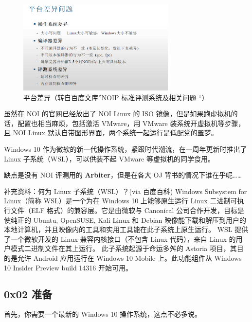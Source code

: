 \begin{figure}[htbp]
\centering
\includegraphics[width=0.7\textwidth]{docs/intro/images/WSL3.png} 
\caption{平台差异（转自百度文库”NOIP 标准评测系统及相关问题 “）}
\end{figure}



虽然在 NOI 的官网已经放出了 NOI Linux 的 ISO 镜像，但是如果跑虚拟机的话，配置也相当麻烦，包括激活 VMware，用 VMware 装系统开虚拟机等步骤，且 NOI Linux 默认自带图形界面，两个系统一起运行是低配党的噩梦。

Windows 10 作为微软的新一代操作系统，紧跟时代潮流，在一周年更新时推出了 Linux 子系统（WSL），可以供装不起 VMware 等虚拟机的同学食用。  

缺点是没有 NOI 评测用的 \textbf{Arbiter}，但是在各大 OJ 背书的情况下谁在乎呢……

\begin{NOTE}{补充资料：何为 Linux 子系统（WSL）？(via 百度百科)}{}
 Windows Subsystem for Linux（简称 WSL）是一个为在 Windows 10 上能够原生运行 Linux 二进制可执行文件（ELF 格式）的兼容层。它是由微软与 Canonical 公司合作开发，目标是使纯正的 Ubuntu, OpenSUSE, Kali Linux 和 Debian 映像能下载和解压到用户的本地计算机，并且映像内的工具和实用工具能在此子系统上原生运行。  
 WSL 提供了一个微软开发的 Linux 兼容内核接口（不包含 Linux 代码），来自 Linux 的用户模式二进制文件在其上运行。  
 此子系统起源于命运多舛的 Astoria 项目，其目的是允许 Android 应用运行在 Windows 10 Mobile 上。此功能组件从 Windows 10 Insider Preview build 14316 开始可用。

\end{NOTE}


\hr

\subsection{0x02 准备}

首先，你需要一个最新的 Windows 10 操作系统，这点不必多说。  

